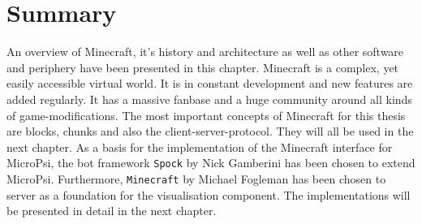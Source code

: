     \section{Summary}
An overview of Minecraft, it's history and architecture as well as other software and periphery have been presented in this chapter. Minecraft is a complex, yet easily accessible virtual world. It is in constant development and new features are added regularly. It has a massive fanbase and a huge community around all kinds of game-modifications. The most important concepts of Minecraft for this thesis are blocks, chunks and also the client-server-protocol. They will all be used in the next chapter.
As a basis for the implementation of the Minecraft interface for MicroPsi, the bot framework \texttt{Spock} by Nick Gamberini has been chosen to extend MicroPsi.
Furthermore, \texttt{Minecraft} by Michael Fogleman has been chosen to server as a foundation for the visualisation component. The implementations will be presented in detail in the next chapter.